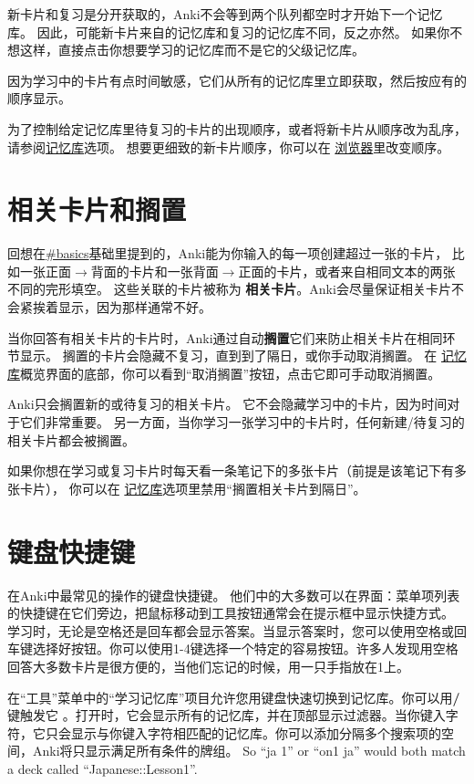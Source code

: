 \documentclass[a4paper]{book}
\begin{document}
	新卡片和复习是分开获取的，Anki不会等到两个队列都空时才开始下一个记忆库。 因此，可能新卡片来自的记忆库和复习的记忆库不同，反之亦然。 如果你不想这样，直接点击你想要学习的记忆库而不是它的父级记忆库。
	
	因为学习中的卡片有点时间敏感，它们从所有的记忆库里立即获取，然后按应有的顺序显示。
	
	为了控制给定记忆库里待复习的卡片的出现顺序，或者将新卡片从顺序改为乱序，请参阅\hyperref[deckoptions]{记忆库}选项。 想要更细致的新卡片顺序，你可以在
	\hyperref[browser]{浏览器}里改变顺序。
	\section{相关卡片和搁置}
	
	回想在\url{#basics}基础里提到的，Anki能为你输入的每一项创建超过一张的卡片， 比如一张正面$\to$背面的卡片和一张背面$\to$正面的卡片，或者来自相同文本的两张不同的完形填空。 这些关联的卡片被称为
	\textbf{相关卡片}。Anki会尽量保证相关卡片不会紧挨着显示，因为那样通常不好。
	
	当你回答有相关卡片的卡片时，Anki通过自动\textbf{搁置}它们来防止相关卡片在相同环节显示。 搁置的卡片会隐藏不复习，直到到了隔日，或你手动取消搁置。 在
	\hyperref[deckoverview]{记忆库}概览界面的底部，你可以看到“取消搁置”按钮，点击它即可手动取消搁置。
	
	Anki只会搁置新的或待复习的相关卡片。 它不会隐藏学习中的卡片，因为时间对于它们非常重要。 另一方面，当你学习一张学习中的卡片时，任何新建/待复习的相关卡片都会被搁置。
	
	如果你想在学习或复习卡片时每天看一条笔记下的多张卡片（前提是该笔记下有多张卡片）， 你可以在
	\hyperref[deckoptions]{记忆库}选项里禁用“搁置相关卡片到隔日”。
	
	\section{键盘快捷键}
	
	在Anki中最常见的操作的键盘快捷键。 他们中的大多数可以在界面：菜单项列表的快捷键在它们旁边，把鼠标移动到工具按钮通常会在提示框中显示快捷方式。
	学习时，无论是空格还是回车都会显示答案。当显示答案时，您可以使用空格或回车键选择好按钮。你可以使用1-4键选择一个特定的容易按钮。许多人发现用空格回答大多数卡片是很方便的，当他们忘记的时候，用一只手指放在1上。
	
	在“工具”菜单中的“学习记忆库”项目允许您用键盘快速切换到记忆库。你可以用\textbf{/}键触发它 。打开时，它会显示所有的记忆库，并在顶部显示过滤器。当你键入字符，它只会显示与你键入字符相匹配的记忆库。你可以添加分隔多个搜索项的空间，Anki将只显示满足所有条件的牌组。 So “ja 1” or “on1 ja” would both match a deck called
	“Japanese::Lesson1”.
	
\end{document}
